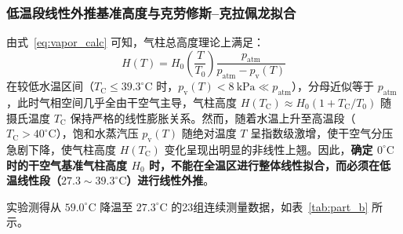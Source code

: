 \documentclass[10pt, a4paper]{ctexart}
\begin{document}
\subsubsection{低温段线性外推基准高度与克劳修斯--克拉佩龙拟合}
由式~\eqref{eq:vapor_calc} 可知，气柱总高度理论上满足：
\begin{equation}
H(T) = H_0 \left(\frac{T}{T_0}\right) \frac{p_{\mathrm{atm}}}{p_{\mathrm{atm}} - p_{\mathrm{v}}(T)}
\label{eq:h_nonlinear}
\end{equation}
在较低水温区间（$T_{\mathrm{C}} \le 39.3^\circ\mathrm{C}$ 时，$p_{\mathrm{v}}(T) < 8\ \mathrm{kPa} \ll p_{\mathrm{atm}}$），分母近似等于 $p_{\mathrm{atm}}$，此时气相空间几乎全由干空气主导，气柱高度 $H(T_{\mathrm{C}}) \approx H_0(1 + T_{\mathrm{C}}/T_0)$ 随摄氏温度 $T_{\mathrm{C}}$ 保持严格的线性膨胀关系。然而，随着水温上升至高温段（$T_{\mathrm{C}} > 40^\circ\mathrm{C}$），饱和水蒸汽压 $p_{\mathrm{v}}(T)$ 随绝对温度 $T$ 呈指数级激增，使干空气分压急剧下降，使气柱高度 $H(T_{\mathrm{C}})$ 变化呈现出明显的非线性上翘。因此，\textbf{确定 $0^\circ\mathrm{C}$ 时的干空气基准气柱高度 $H_0$ 时，不能在全温区进行整体线性拟合，而必须在低温线性段（$27.3\sim 39.3^\circ\mathrm{C}$）进行线性外推}。

实验测得从 $59.0^\circ\mathrm{C}$ 降温至 $27.3^\circ\mathrm{C}$ 的23组连续测量数据，如表~\ref{tab:part_b} 所示。
\end{document}
